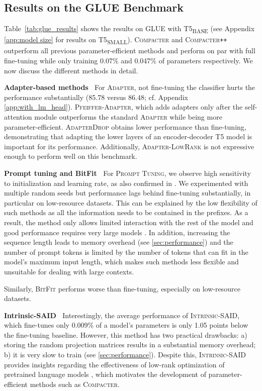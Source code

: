 \subsection{Results on the GLUE Benchmark}

Table~\ref{tab:glue_results} shows the results on \textsc{GLUE} with T5\textsubscript{\tiny BASE} (see Appendix \ref{app:model size} for results on T5\textsubscript{\tiny SMALL}). \textsc{Compacter} and \textsc{Compacter}\texttt{++} outperform all previous parameter-efficient methods and perform on par with full fine-tuning while only training 0.07\% and 0.047\% of parameters respectively. We now discuss the different methods in detail.

 \textbf{Adapter-based methods} $\:$ For \textsc{Adapter}, not fine-tuning the classifier hurts the performance substantially (85.78 versus 86.48; cf. Appendix \ref{app:with_lm_head}). \textsc{Pfeiffer-Adapter}, which adds adapters only after the self-attention module outperforms the standard \textsc{Adapter} while being more parameter-efficient. \textsc{AdapterDrop} obtains lower performance than fine-tuning, demonstrating that adapting the lower layers of an encoder-decoder T5 model is important for its performance. Additionally, \textsc{Adapter-LowRank} is not expressive enough to perform well on this benchmark.

 \textbf{Prompt tuning and BitFit} $\:$ For \textsc{Prompt Tuning}, we observe high sensitivity to initialization and learning rate, as also confirmed in \cite{li2021prefix}. We experimented with multiple random seeds but performance lags behind fine-tuning substantially, in particular on low-resource datasets. This can be explained by the low flexibility of such methods as all the information needs to be contained in the prefixes. As a result, the method only allows limited interaction with the rest of the model and good performance requires very large models \citep{lester2021power}. In addition, increasing the sequence length leads to memory overhead (see \textsection \ref{sec:performance}) and the number of prompt tokens is limited by the number of tokens that can fit in the model's maximum input length, which makes such methods less flexible and unsuitable for dealing with large contexts.

Similarly, \textsc{BitFit} performs worse than fine-tuning, especially on low-resource datasets. 

 \textbf{Intrinsic-SAID} $\:$ Interestingly, the average performance of \textsc{Intrinsic-SAID}, which fine-tunes only 0.009\% of a model's parameters is only 1.05 points below the fine-tuning baseline. However, this method has two practical drawbacks: a) storing the random projection matrices results in a substantial memory overhead;  b) it is very slow to train (see \textsection \ref{sec:performance}). Despite this, \textsc{Intrinsic-SAID} provides insights regarding the effectiveness of low-rank optimization of pretrained language models \citep{aghajanyan2020intrinsic}, which motivates the development of parameter-efficient methods such as \textsc{Compacter}.

